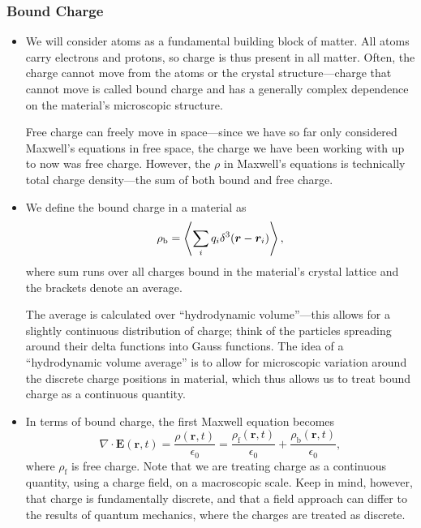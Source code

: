 \documentclass[11pt, a4paper]{article}
\renewcommand{\vec}[1]{\bm{#1}} %
\renewcommand{\r}{\vec{r}}
\newcommand{\E}{\vec{E}} %
\newcommand{\ee}{\epsilon_{0}}  %
\renewcommand{\div}{\nabla \cdot}
\begin{document}
\subsubsection{Bound Charge}
\begin{itemize}
	\item We will consider atoms as a fundamental building block of matter. All atoms carry electrons and protons, so charge is thus present in all matter. Often, the charge cannot move from the atoms or the crystal structure---charge that cannot move is called bound charge and has a generally complex dependence on the material's microscopic structure. 
	
	Free charge can freely move in space---since we have so far only considered Maxwell's equations in free space, the charge we have been working with up to now was free charge. However, the $ \rho $ in Maxwell's equations is technically total charge density---the sum of both bound and free charge. 
	
	\item We define the bound charge in a material as
	\begin{equation*}
		\rho_{\text{b}} = \ev{\sum_{i}q_{i}\delta^{3}(\r - \r_{i})},
	\end{equation*}
    where sum runs over all charges bound in the material's crystal lattice and the brackets denote an average.
	
	The average is calculated over ``hydrodynamic volume''---this allows for a slightly continuous distribution of charge; think of the particles spreading around their delta functions into Gauss functions. The idea of a ``hydrodynamic volume average'' is to allow for microscopic variation around the discrete charge positions in material, which thus allows us to treat bound charge as a continuous quantity. 
	
	\item In terms of bound charge, the first Maxwell equation becomes
	\begin{equation*}
		\div \E (\r, t) = \frac{\rho(\r, t)}{\ee}  = \frac{\rho_{\text{f}}(\r, t)}{\ee} + \frac{\rho_{\text{b}}(\r, t)}{\ee},
	\end{equation*}
	where $ \rho_{\text{f}} $ is free charge. Note that we are treating charge as a continuous quantity, using a charge field, on a macroscopic scale. Keep in mind, however, that charge is fundamentally discrete, and that a field approach can differ to the results of quantum mechanics, where the charges are treated as discrete.
\end{itemize}
\end{document}
